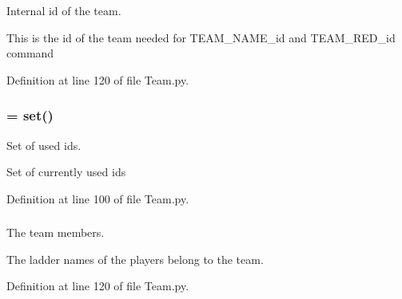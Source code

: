 \-Internal id of the team. 

\-This is the id of the team needed for \-T\-E\-A\-M\-\_\-\-N\-A\-M\-E\-\_\-id and \-T\-E\-A\-M\-\_\-\-R\-E\-D\-\_\-id command 

\-Definition at line 120 of file \-Team.\-py.

\hypertarget{class_team_1_1_team_a6ad398e49c618e8fbcbc198c02d467dc}{
\subsubsection[{\-\_\-\-\_\-ids}]{ = set()}}
\label{class_team_1_1_team_a6ad398e49c618e8fbcbc198c02d467dc}


\-Set of used ids. 

\-Set of currently used ids 

\-Definition at line 100 of file \-Team.\-py.

\hypertarget{class_team_1_1_team_a8e3ff016fa310c75baa3d4ebd2bc4c17}{
\subsubsection[{\-\_\-\-\_\-members}]{}}
\label{class_team_1_1_team_a8e3ff016fa310c75baa3d4ebd2bc4c17}


\-The team members. 

\-The ladder names of the players belong to the team. 

\-Definition at line 120 of file \-Team.\-py.

\hypertarget{class_team_1_1_team_a371424025affb2cf973b2a81eb4bc6d9}{
\subsubsection[{\-\_\-\-\_\-name}]{}}
\label{class_team_1_1_team_a371424025affb2cf973b2a81eb4bc6d9}



